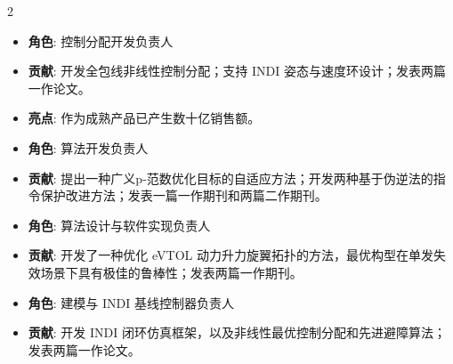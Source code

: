 \documentclass[10pt,a4paper,ragged2e,withhyper]{altacv}
\begin{document}
\begin{paracol}{2}
            \begin{itemize} \justifying
                \item \textbf{角色}: 控制分配开发负责人
                \item \textbf{贡献}: 开发全包线非线性控制分配；支持 INDI 姿态与速度环设计；发表两篇一作论文。
                \item \textbf{亮点}: 作为成熟产品已产生数十亿销售额。
            \end{itemize}
            
        
            \begin{itemize} \justifying
                \item \textbf{角色}: 算法开发负责人
                \item \textbf{贡献}: 提出一种广义p-范数优化目标的自适应方法；开发两种基于伪逆法的指令保护改进方法；发表一篇一作期刊和两篇二作期刊。
            \end{itemize}
            \bigskip

            \begin{itemize} \justifying
                \item \textbf{角色}: 算法设计与软件实现负责人
                \item \textbf{贡献}: 开发了一种优化 eVTOL 动力升力旋翼拓扑的方法，最优构型在单发失效场景下具有极佳的鲁棒性；发表两篇一作期刊。
            \end{itemize}
            \bigskip

            \begin{itemize} \justifying
                \item \textbf{角色}: 建模与 INDI 基线控制器负责人
                \item \textbf{贡献}: 开发 INDI 闭环仿真框架，以及非线性最优控制分配和先进避障算法；发表两篇一作论文。
            \end{itemize}
            \bigskip
        
        \nocite{*} %
        \printbibliography[heading=none]


\end{paracol}
\end{document}
